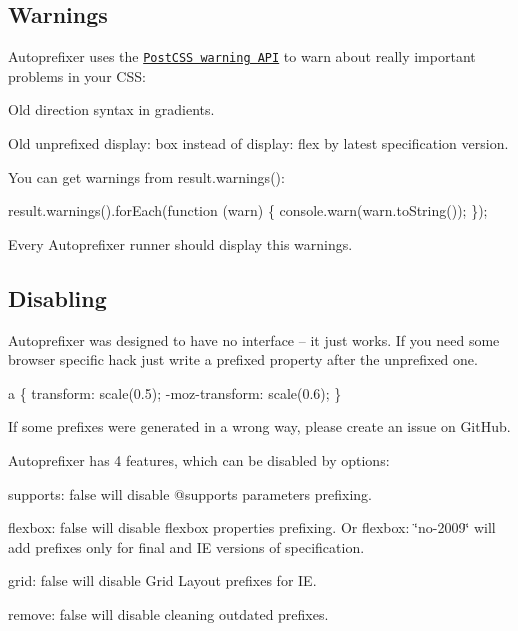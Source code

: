 \subsection*{Warnings}

Autoprefixer uses the \href{https://github.com/postcss/postcss/blob/master/docs/api.md#warning-class}{\tt Post\+C\+SS warning A\+PI} to warn about really important problems in your C\+SS\+:


\begin{DoxyItemize}
\item Old direction syntax in gradients.
\item Old unprefixed {\ttfamily display\+: box} instead of {\ttfamily display\+: flex} by latest specification version.
\end{DoxyItemize}

You can get warnings from {\ttfamily result.\+warnings()}\+:


\begin{DoxyCode}
result.warnings().forEach(function (warn) \{
    console.warn(warn.toString());
\});
\end{DoxyCode}


Every Autoprefixer runner should display this warnings.

\subsection*{Disabling}

Autoprefixer was designed to have no interface – it just works. If you need some browser specific hack just write a prefixed property after the unprefixed one.


\begin{DoxyCode}
a \{
    transform: scale(0.5);
    -moz-transform: scale(0.6);
\}
\end{DoxyCode}


If some prefixes were generated in a wrong way, please create an issue on Git\+Hub.

Autoprefixer has 4 features, which can be disabled by options\+:


\begin{DoxyItemize}
\item {\ttfamily supports\+: false} will disable {\ttfamily @supports} parameters prefixing.
\item {\ttfamily flexbox\+: false} will disable flexbox properties prefixing. Or {\ttfamily flexbox\+: \char`\"{}no-\/2009\char`\"{}} will add prefixes only for final and IE versions of specification.
\item {\ttfamily grid\+: false} will disable Grid Layout prefixes for IE.
\item {\ttfamily remove\+: false} will disable cleaning outdated prefixes.
\end{DoxyItemize}

